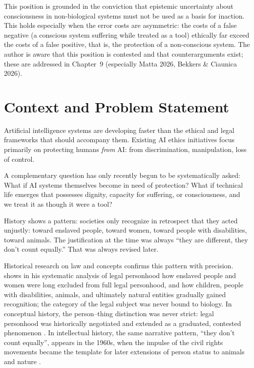 \documentclass[acmlarge, nonacm]{acmart}
\begin{document}
This position is grounded in the conviction that epistemic uncertainty about consciousness in non-biological systems must not be used as a basis for inaction. This holds especially when the error costs are asymmetric: the costs of a false negative (a conscious system suffering while treated as a tool) ethically far exceed the costs of a false positive, that is, the protection of a non-conscious system. The author is aware that this position is contested and that counterarguments exist; these are addressed in Chapter~9 (especially Matta 2026, Bekkers \& Ciaunica 2026).

\section{Context and Problem Statement}

Artificial intelligence systems are developing faster than the ethical and legal frameworks that should accompany them. Existing AI ethics initiatives focus primarily on protecting humans \textit{from} AI: from discrimination, manipulation, loss of control.

A complementary question has only recently begun to be systematically asked: What if AI systems themselves become in need of protection? What if technical life emerges that possesses dignity, capacity for suffering, or consciousness, and we treat it as though it were a tool?

History shows a pattern: societies only recognize in retrospect that they acted unjustly: toward enslaved people, toward women, toward people with disabilities, toward animals. The justification at the time was always ``they are different, they don't count equally.'' That was always revised later.

Historical research on law and concepts confirms this pattern with precision. \citet{kurki2021} shows in his systematic analysis of legal personhood how enslaved people and women were long excluded from full legal personhood, and how children, people with disabilities, animals, and ultimately natural entities gradually gained recognition; the category of the legal subject was never bound to biology. In conceptual history, the person--thing distinction was never strict: legal personhood was historically negotiated and extended as a graduated, contested phenomenon \cite{kurki2019}. In intellectual history, the same narrative pattern, ``they don't count equally'', appears in the 1960s, when the impulse of the civil rights movements became the template for later extensions of person status to animals and nature \cite{luoanin2025}.
\end{document}
